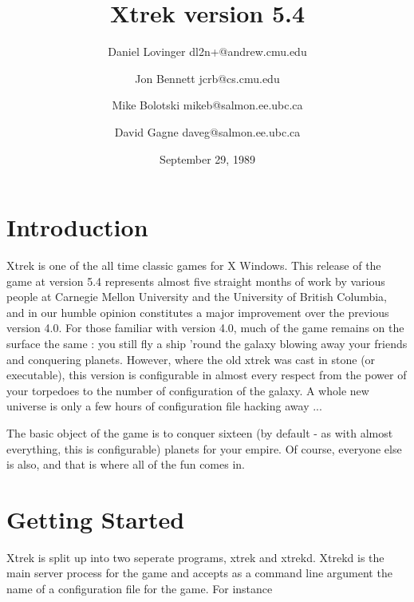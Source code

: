 
\title{Xtrek version 5.4}

\author{Daniel Lovinger dl2n+@andrew.cmu.edu}
\author{Jon Bennett jcrb@cs.cmu.edu}
\author{Mike Bolotski mikeb@salmon.ee.ubc.ca}
\author{David Gagne daveg@salmon.ee.ubc.ca}

\date{September 29, 1989}

\parindent 0in
\parskip 0.10in 
\textwidth 6.5in
\oddsidemargin 0in
\evensidemargin 0in
\textheight 8.175in
\topmargin -0.25in



\maketitle

\tableofcontents \newpage

\section{Introduction}

Xtrek is one of the all time classic games for X Windows. This release of the game at
version 5.4 represents almost five straight months of work by various people at 
Carnegie Mellon University and the University of British Columbia, and in our humble
opinion constitutes a major improvement over the previous version 4.0. For those familiar
with version 4.0, much of the game remains on the surface the same : you still fly a ship
'round the galaxy blowing away your friends and conquering planets. However, where the old
xtrek was cast in stone (or executable), this version is configurable in almost every respect
from the power of your torpedoes to the number of configuration of the galaxy. A whole new
universe is only a few hours of configuration file hacking away ...

The basic object of the game is to conquer sixteen (by default - as with almost everything, 
this is configurable) planets for your empire. Of course, everyone else is also, and that is where
all of the fun comes in.

\section{Getting Started}

Xtrek is split up into two seperate programs, xtrek and xtrekd. Xtrekd is the main server process for the game
and accepts as a command line argument the name of a configuration file for the game. For instance

